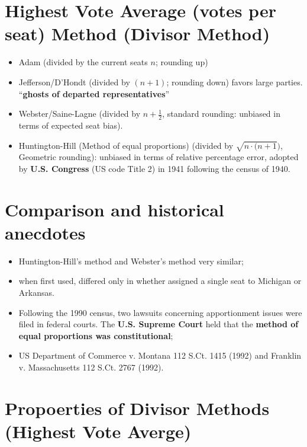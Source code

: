 \documentclass[
  letterpaper,
  DIV=11,
  numbers=noendperiod]{scrreprt}
\providecommand{\tightlist}{%
  \setlength{\itemsep}{0pt}\setlength{\parskip}{0pt}}\usepackage{longtable,booktabs,array}
\begin{document}
\section{Highest Vote Average (votes per seat) Method (Divisor
Method)}\label{highest-vote-average-votes-per-seat-method-divisor-method}

\begin{itemize}
\tightlist
\item
  Adam (divided by the current seats \(n\); rounding up)
\item
  Jefferson/D'Hondt (divided by \((n+1)\); rounding down) favors large
  parties. ``\textbf{ghosts of departed representatives}''
\item
  Webster/Saine-Lagne (divided by \(n+\frac{1}{2}\), standard rounding:
  unbiased in terms of expected seat bias).
\item
  Huntington-Hill (Method of equal proportions) (divided by
  \(\sqrt{n\cdot(n+1})\), Geometric rounding): unbiased in terms of
  relative percentage error, adopted by \textbf{U.S. Congress} (US code
  Title 2) in 1941 following the census of 1940.
\end{itemize}

\section{Comparison and historical
anecdotes}\label{comparison-and-historical-anecdotes}

\begin{itemize}
\item
  Huntington-Hill's method and Webster's method very similar;
\item
  when first used, differed only in whether assigned a single seat to
  Michigan or Arkansas.
\item
  Following the 1990 census, two lawsuits concerning apportionment
  issues were filed in federal courts. The \textbf{U.S. Supreme Court}
  held that the \textbf{method of equal proportions was constitutional};
\item
  US Department of Commerce v. Montana 112 S.Ct. 1415 (1992) and
  Franklin v. Massachusetts 112 S.Ct. 2767 (1992).
\end{itemize}

\section{Propoerties of Divisor Methods (Highest Vote
Averge)}\label{propoerties-of-divisor-methods-highest-vote-averge}
\end{document}
